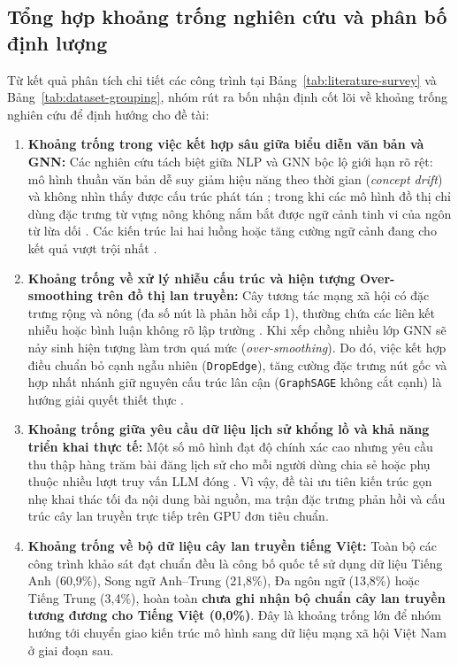 \documentclass[11pt,a4paper]{extreport}
\begin{document}
\subsection{Tổng hợp khoảng trống nghiên cứu và phân bố định lượng}
Từ kết quả phân tích chi tiết các công trình tại Bảng~\ref{tab:literature-survey} và Bảng~\ref{tab:dataset-grouping}, nhóm rút ra bốn nhận định cốt lõi về khoảng trống nghiên cứu để định hướng cho đề tài:
\begin{enumerate}
    \item \textbf{Khoảng trống trong việc kết hợp sâu giữa biểu diễn văn bản và GNN:} Các nghiên cứu tách biệt giữa NLP và GNN bộc lộ giới hạn rõ rệt: mô hình thuần văn bản dễ suy giảm hiệu năng theo thời gian (\textit{concept drift}) và không nhìn thấy được cấu trúc phát tán \cite{noauthor_improving_2025}; trong khi các mô hình đồ thị chỉ dùng đặc trưng từ vựng nông không nắm bắt được ngữ cảnh tinh vi của ngôn từ lừa dối \cite{noauthor_early_2025}. Các kiến trúc lai hai luồng hoặc tăng cường ngữ cảnh đang cho kết quả vượt trội nhất \cite{noauthor_dual_2025, noauthor_integrating_2025, yan_trgcn_2026}.
    \item \textbf{Khoảng trống về xử lý nhiễu cấu trúc và hiện tượng Over-smoothing trên đồ thị lan truyền:} Cây tương tác mạng xã hội có đặc trưng rộng và nông (đa số nút là phản hồi cấp 1), thường chứa các liên kết nhiễu hoặc bình luận không rõ lập trường \cite{noauthor_exploiting_2024, cui_propagation_2024, cui_avoiding_2026}. Khi xếp chồng nhiều lớp GNN sẽ nảy sinh hiện tượng làm trơn quá mức (\textit{over-smoothing}). Do đó, việc kết hợp điều chuẩn bỏ cạnh ngẫu nhiên (\texttt{DropEdge}), tăng cường đặc trưng nút gốc và hợp nhất nhánh giữ nguyên cấu trúc lân cận (\texttt{GraphSAGE} không cắt cạnh) là hướng giải quyết thiết thực \cite{noauthor_integrating_2025, wei_towards_2021}.
    \item \textbf{Khoảng trống giữa yêu cầu dữ liệu lịch sử khổng lồ và khả năng triển khai thực tế:} Một số mô hình đạt độ chính xác cao nhưng yêu cầu thu thập hàng trăm bài đăng lịch sử cho mỗi người dùng chia sẻ hoặc phụ thuộc nhiều lượt truy vấn LLM đóng \cite{noauthor_co-attention_2025, tao_llm-enhanced_2026}. Vì vậy, đề tài ưu tiên kiến trúc gọn nhẹ khai thác tối đa nội dung bài nguồn, ma trận đặc trưng phản hồi và cấu trúc cây lan truyền trực tiếp trên GPU đơn tiêu chuẩn.
    \item \textbf{Khoảng trống về bộ dữ liệu cây lan truyền tiếng Việt:} Toàn bộ các công trình khảo sát đạt chuẩn đều là công bố quốc tế sử dụng dữ liệu Tiếng Anh (60,9\%), Song ngữ Anh--Trung (21,8\%), Đa ngôn ngữ (13,8\%) hoặc Tiếng Trung (3,4\%), hoàn toàn \textbf{chưa ghi nhận bộ chuẩn cây lan truyền tương đương cho Tiếng Việt (0,0\%)}. Đây là khoảng trống lớn để nhóm hướng tới chuyển giao kiến trúc mô hình sang dữ liệu mạng xã hội Việt Nam ở giai đoạn sau.
\end{enumerate}
\end{document}
